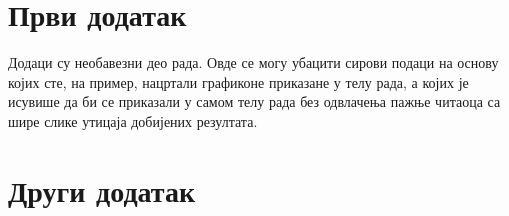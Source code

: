 \chapter{Први додатак}
Додаци су необавезни део рада. Овде се могу убацити сирови подаци на основу којих сте, на пример, нацртали графиконе приказане у телу рада, а којих је исувише да би се приказали у самом телу рада без одвлачења пажње читаоца са шире слике утицаја добијених резултата.

\chapter{Други додатак}
